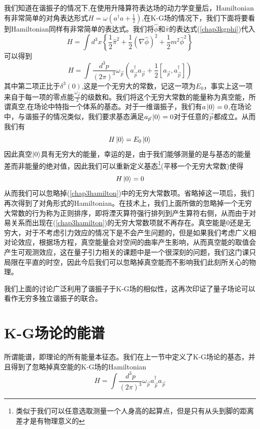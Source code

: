 我们知道在谐振子的情况下,在使用升降算符表达场的动力学变量后，Hamiltonian有非常简单的对角表达形式$H=\omega(a^{\dagger}a+\frac{1}{2})$,在K-G场的情况下，我们下面将要看到Hamiltonian同样有非常简单的表达式。我们将$\hat{\phi}$和$\hat{\pi}$的表达式(\ref{chap3kgphi})代入
\begin{equation}
    H=\int d^{3}x\left\{\frac{1}{2}\hat{\pi}^{2}+\frac{1}{2}(\nabla \hat{\phi})^{2}+\frac{1}{2}m^{2}\hat{\phi}^{2}\right\}
\end{equation}
可以得到
\begin{equation}
\label{chap3hamilton}
    H=\int \frac{d^{3}p}{(2\pi)^{3}}\omega_{\vec{p}}\left(a^{\dagger}_{\vec{p}}a_{\vec{p}}+\frac{1}{2}\left[a_{\vec{p}},a^{\dagger}_{\vec{p}}\right]\right)
\end{equation}
其中第二项正比于$\delta^{3}(0)$,这是一个无穷大的常数，记这一项为$E_{0}$，事实上这一项来自于每一项的零点能$\frac{\omega_{\vec{p}}}{2}$的级数和。我们将这个无穷大常数的能量称为真空能，所谓真空,在场论中特指一个体系的基态。对于一维谐振子，我们有$a\ket{0}=0$,在场论中，与谐振子的情况类似，我们要求基态满足$a_{\vec{p}}\ket{0}=0$对于任意的$\vec{p}$都成立。从而我们有
\begin{equation}
    H\ket{0}=E_{0}\ket{0}
\end{equation}
因此真空$\ket{0}$具有无穷大的能量，幸运的是，由于我们能够测量的是与基态的能量差而非能量的绝对值，因此我们可以重新定义基态\footnote{类似于我们可以任意选取测量一个人身高的起算点，但是只有从头到脚的距离差才是有物理意义的}(平移一个无穷大常数)使得
\begin{equation}
    H\ket{0}=0
\end{equation}
从而我们可以忽略掉(\ref{chap3hamilton})中的无穷大常数项。省略掉这一项后，我们再次得到了对角形式的Hamiltonian。在技术上，我们上面所做的忽略掉一个无穷大常数的行为称为正则排序，即将湮灭算符强行排列到产生算符右侧，从而由于对易关系而出现在(\ref{chap3hamilton})的无穷大常数项就不再存在。真空能是0还是无穷大，对于不考虑引力效应的情况下是不会产生问题的，但是如果我们考虑广义相对论效应，根据场方程，真空能量会对空间的曲率产生影响，从而真空能的取值会产生可观测效应，这在量子引力相关的课题中是一个很深刻的问题，我们这门课只局限在平直的时空，因此今后我们可以忽略掉真空能而不影响我们此刻所关心的物理。

我们上面的讨论广泛利用了谐振子于K-G场的相似性，这再次印证了量子场论可以看作无穷多独立谐振子的联合。
\section{K-G场论的能谱}
所谓能谱，即理论的所有能量本征态。我们在上一节中定义了K-G场论的基态，并且得到了忽略掉真空能的K-G场的Hamiltonian
\begin{equation}
    H=\int \frac{d^{3}p}{(2\pi)^{3}}\omega_{\vec{p}}a^{\dagger}_{\vec{p}}a_{\vec{p}}
\end{equation}

